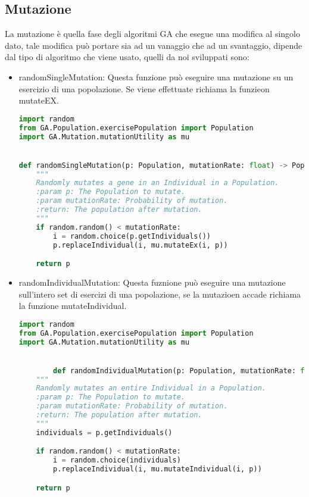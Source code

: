 \documentclass{article}
\begin{document}
    \subsection{Mutazione}
    La mutazione è quella fase degli algoritmi GA che esegue una modifica al singolo dato, tale modifica può portare sia ad un vanaggio che ad un svantaggio, dipende dal tipo di algoritmo che viene usato, quelli da noi sviluppati sono:
    \begin{itemize}
        \item randomSingleMutation: Questa funzione può eseguire una mutazione su un esercizio di una popolazione. Se viene effettuate richiama la funzieon mutateEX.
        \begin{lstlisting}[language=Python, breaklines, no caption]
import random
from GA.Population.exercisePopulation import Population
import GA.Mutation.mutationUtility as mu


def randomSingleMutation(p: Population, mutationRate: float) -> Population:
    """
    Randomly mutates a gene in an Individual in a Population.
    :param p: The Population to mutate.
    :param mutationRate: Probability of mutation.
    :return: The population after mutation.
    """
    if random.random() < mutationRate:
        i = random.choice(p.getIndividuals())
        p.replaceIndividual(i, mu.mutateEx(i, p))

    return p

        \end{lstlisting}
    \end{itemize}
    \begin{itemize}
        \item randomIndividualMutation: Questa fuznione può eseguire una mutazione sull'intero set di esercizi di una popolazione, se la mutazioen accade richiama la funzione mutateIndividual.
        \begin{lstlisting}[language=Python, breaklines, no caption]
import random
from GA.Population.exercisePopulation import Population
import GA.Mutation.mutationUtility as mu


        def randomIndividualMutation(p: Population, mutationRate: float) -> Population:
    """
    Randomly mutates an entire Individual in a Population.
    :param p: The Population to mutate.
    :param mutationRate: Probability of mutation.
    :return: The population after mutation.
    """
    individuals = p.getIndividuals()

    if random.random() < mutationRate:
        i = random.choice(individuals)
        p.replaceIndividual(i, mu.mutateIndividual(i, p))

    return p
        \end{lstlisting}
    \end{itemize}
\end{document}
